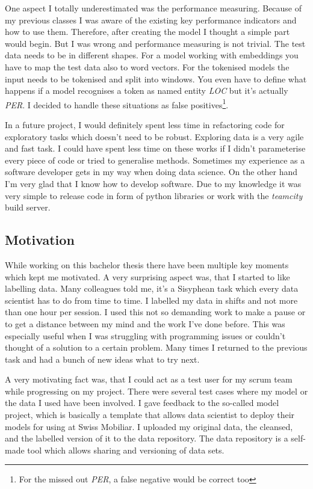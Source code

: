 One aspect I totally underestimated was the performance measuring. Because of my previous classes I was aware of the existing key performance indicators and how to use them. Therefore, after creating the model I thought a simple part would begin. But I was wrong and performance measuring is not trivial. The test data needs to be in different shapes. For a model working with embeddings you have to map the test data also to word vectors. For the tokenised models the input needs to be tokenised and split into windows. You even have to define what happens if a model recognises a token as named entity \emph{LOC} but it's actually \emph{PER}. I decided to handle these situations as false positives\footnote{For the missed out \emph{PER}, a false negative would be correct too}.

In a future project, I would definitely spent less time in refactoring code for exploratory tasks which doesn't need to be robust. Exploring data is a very agile and fast task. I could have spent less time on these works if I didn't parameterise every piece of code or tried to generalise methods. Sometimes my experience as a software developer gets in my way when doing data science. On the other hand I'm very glad that I know how to develop software. Due to my knowledge it was very simple to release code in form of python libraries or work with the \emph{teamcity} build server.

\subsection{Motivation}

While working on this bachelor thesis there have been multiple key moments which kept me motivated. A very surprising aspect was, that I started to like labelling data. Many colleagues told me, it's a Sisyphean task which every data scientist has to do from time to time. I labelled my data in shifts and not more than one hour per session. I used this not so demanding work to make a pause or to get a distance between my mind and the work I've done before. This was especially useful when I was struggling with programming issues or couldn't thought of a solution to a certain problem. Many times I returned to the previous task and had a bunch of new ideas what to try next.

A very motivating fact was, that I could act as a test user for my scrum team while progressing on my project. There were several test cases where my model or the data I used have been involved. I gave feedback to the so-called model project, which is basically a template that allows data scientist to deploy their models for using at Swiss Mobiliar. I uploaded my original data, the cleansed, and the labelled version of it to the data repository. The data repository is a self-made tool which allows sharing and versioning of data sets.

